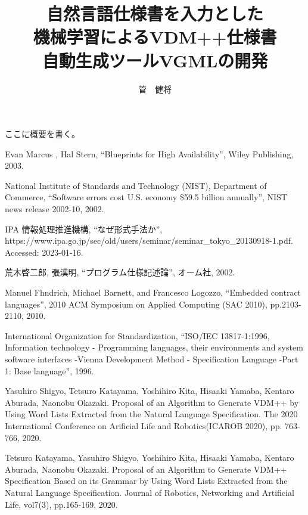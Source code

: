 \documentclass[uplatex, report, a4j, 10pt]{jsbook}
\title{自然言語仕様書を入力とした\\機械学習によるVDM++仕様書\\自動生成ツールVGMLの開発}
\author{菅　健将}
\begin{document}
\maketitle

%
% 
ここに概要を書く。


%
% 








%


%
\begin{thebibliography}{10}
     Evan Marcus , Hal Stern, “Blueprints for High Availability”, Wiley Publishing, 2003. 

     National Institute of Standards and Technology (NIST), Department of Commerce, “Software errors cost U.S. economy \$59.5 billion annually”, NIST news release 2002-10, 2002. 

     IPA 情報処理推進機構,  “なぜ形式手法か”, https:\slash \slash www.ipa.go.jp\slash sec\slash old\slash users\slash seminar\slash seminar\_tokyo\_20130918-1.pdf. Accessed: 2023-01-16.

     荒木啓二郎, 張漢明,  “プログラム仕様記述論”, オーム社, 2002.

     Manuel Fhndrich, Michael Barnett, and Francesco Logozzo, “Embedded contract languages”, 2010 ACM Symposium on Applied Computing (SAC 2010), pp.2103-2110, 2010.
	 
     International Organization for Standardization, “ISO/IEC 13817-1:1996, Information technology - Programming languages, their environments and system software interfaces -Vienna Development Method - Specification Language -Part 1: Base language”, 1996.
    
    Yasuhiro Shigyo, Tetsuro Katayama, Yoshihiro Kita, Hisaaki Yamaba, Kentaro Aburada, Naonobu Okazaki. 
    Proposal of an Algorithm to Generate VDM++ by Using Word Lists Extracted from the Natural Language Specification. 
    The 2020 International Conference on Arificial Life and Robotics(ICAROB 2020), 
    pp. 763-766, 2020.
    
    Tetsuro Katayama, Yasuhiro Shigyo, Yoshihiro Kita, Hisaaki Yamaba, Kentaro Aburada, Naonobu Okazaki. 
    Proposal of an Algorithm to Generate VDM++ Specification Based on its Grammar by Using Word Lists Extracted from the Natural Language Specification. 
    Journal of Robotics, Networking and Artificial Life, vol7(3), pp.165-169, 2020.


\end{thebibliography}
\end{document}
